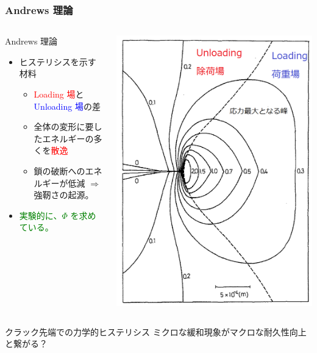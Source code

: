 \documentclass[12pt, dvipdfmx]{beamer}
\begin{document}
\begin{frame}
	\frametitle{Andrews 理論}
	\begin{columns}[totalwidth=1\textwidth]
		\begin{exampleblock}{Andrews 理論}
			\begin{itemize}
			\item
			\alert{ヒステリシス}を示す材料
				\begin{itemize}
				\item
				\textcolor{red}{Loading 場}と\textcolor{blue}{Unloading 場}の差
				\item
				全体の変形に要したエネルギーの多くを\textcolor{red}{散逸}
				\item
			鎖の破断へのエネルギーが低減 $\Rightarrow$ \alert{強靭さの起源。}
				\end{itemize}	
			\item
			\textcolor{green}{実験的に、$\Phi$ を求めている。}
			\end{itemize}
		\end{exampleblock}
		\centering
		\includegraphics[width=\textwidth]{./crack.png}
	\end{columns}
	
	\begin{alertblock}{クラック先端での力学的ヒステリシス}
	\alert{ミクロな緩和現象}がマクロな耐久性向上と繋がる？
	\end{alertblock}
\end{frame}
\end{document}
